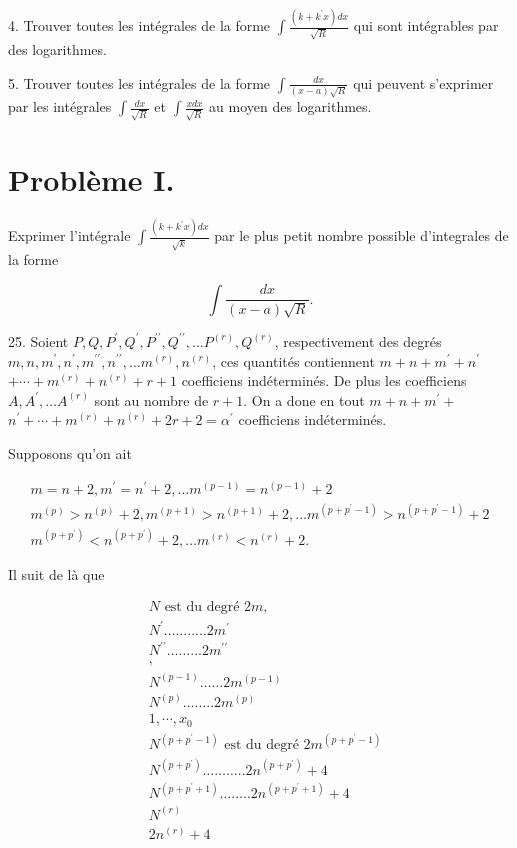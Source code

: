 \documentclass{article}
\begin{document}
4. Trouver toutes les intégrales de la forme \(\int \frac{\left(k+k^{\prime} x\right) d x}{\sqrt{R}}\) qui sont intégrables par des logarithmes.

5. Trouver toutes les intégrales de la forme \(\int \frac{d x}{(x-a) \sqrt{R}}\) qui peuvent s'exprimer par les intégrales \(\int \frac{d x}{\sqrt{R}}\) et \(\int \frac{x d x}{\sqrt{R}}\) au moyen des logarithmes.

\section*{Problème I.}

Exprimer l'intégrale \(\int \frac{\left(k+k^{\prime} x\right) d x}{\sqrt{k}}\) par le plus petit nombre possible d'integrales de la forme

\[
\int \frac{d x}{(x-a) \sqrt{R}} .
\]

25. Soient \(P, Q, P^{\prime}, Q^{\prime}, P^{\prime \prime}, Q^{\prime \prime}, \ldots P^{(r)}, Q^{(r)}\), respectivement des degrés \(m, n, m^{\prime}, n^{\prime}, m^{\prime \prime}, n^{\prime \prime}, \ldots m^{(r)}, n^{(r)}\), ces quantités contiennent \(m+n+m^{\prime}+n^{\prime}\) \(+\cdots+m^{(r)}+n^{(r)}+r+1\) coefficiens indéterminés. De plus les coefficiens \(A, A^{\prime}, \ldots A^{(r)}\) sont au nombre de \(r+1\). On a done en tout \(m+n+m^{\prime}+\) \(n^{\prime}+\cdots+m^{(r)}+n^{(r)}+2 r+2=\alpha^{\prime}\) coefficiens indéterminés.

Supposons qu'on ait

\[
\begin{gathered}
m=n+2, m^{\prime}=n^{\prime}+2, \ldots m^{(p-1)}=n^{(p-1)}+2 \\
m^{(p)}>n^{(p)}+2, m^{(p+1)}>n^{(p+1)}+2, \ldots m^{\left(p+p^{\prime}-1\right)}>n^{\left(p+p^{\prime}-1\right)}+2 \\
m^{\left(p+p^{\prime}\right)}<n^{\left(p+p^{\prime}\right)}+2, \ldots m^{(r)}<n^{(r)}+2 .
\end{gathered}
\]

Il suit de là que

\[
\begin{aligned}
& N \text { est du degré } 2 m \text {, } \\
& N^{\prime} \ldots \ldots . . . . .2 m^{\prime} \\
& N^{\prime \prime} \ldots \ldots . . .2 m^{\prime \prime} \\
& \text {, } \\
& N^{(p-1)} \ldots \ldots 2 m^{(p-1)} \\
& N^{(p)} \ldots \ldots . .2 m^{(p)} \\
& 1, \cdots, x_{0} \\
& N^{\left(p+p^{\prime}-1\right)} \text { est du degré } 2 m^{\left(p+p^{\prime}-1\right)} \\
& N^{\left(p+p^{\prime}\right)} \ldots \ldots \ldots . .2 n^{\left(p+p^{\prime}\right)}+4 \\
& N^{\left(p+p^{\prime}+1\right)} \ldots \ldots . .2 n^{\left(p+p^{\prime}+1\right)}+4 \\
& N^{(r)} \\
& 2 n^{(r)}+4
\end{aligned}
\]
\end{document}
